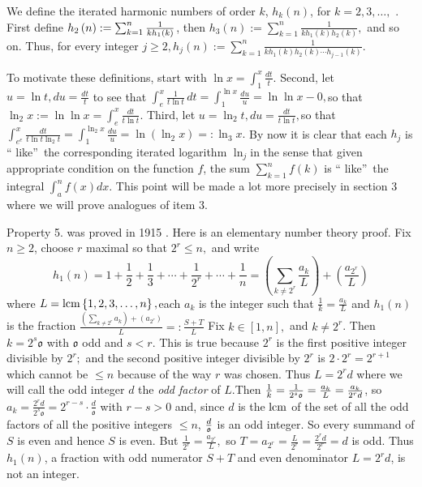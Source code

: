 \documentclass{article}
\begin{document}
We define the iterated harmonic numbers of order $k$, $h_{k}(n)$, for $%
k=2,3,\dots ,$ . First define $h_{2}\left( n\right) :=\sum_{k=1}^{n}\frac{1}{%
kh_{1}\left( k\right) }$, then $h_{3}\left( n\right) :=\sum_{k=1}^{n}\frac{1%
}{kh_{1}\left( k\right) h_{2}\left( k\right) },$ and so on. Thus, for every
integer $j\geq 2,h_{j}\left( n\right) :=\sum_{k=1}^{n}\frac{1}{kh_{1}\left(
k\right) h_{2}\left( k\right) \cdots h_{j-1}\left( k\right) }$.

To motivate these definitions, start with $\ln x=\int_{1}^{x}\frac{dt}{t}.$%
Second, let $u=\ln t,du=\frac{dt}{t}$ to see that $\allowbreak \int_{e}^{x}%
\frac{1}{t\ln t}\,dt=\int_{1}^{\ln x}\frac{du}{u}=\ln \ln x-0,$so that $\ln
_{2}x:=\ln \ln x=\int_{e}^{x}\frac{dt}{t\ln t}$. Third, let $u=\ln _{2}t,du=%
\frac{dt}{t\ln t},$so that $\int_{e^{e}}^{x}\frac{dt}{t\ln t\ln _{2}t}%
=\int_{1}^{\ln _{2}x}\frac{du}{u}=\ln \left( \ln _{2}x\right) =:\ln _{3}x.$
By now it is clear that each $h_{j}$ is \textquotedblleft
like\textquotedblright\ the corresponding iterated logarithm $\ln _{j}$in
the sense that given appropriate condition on the function $f$, the sum $%
\sum_{k=1}^{n}f\left( k\right) $ is \textquotedblleft
like\textquotedblright\ the integral $\int_{a}^{n}f\left( x\right) dx.$ This
point will be made a lot more precisely in section 3 where we will prove
analogues of item 3.

Property 5. was proved in 1915 \cite{T}. Here is an elementary number theory
proof. Fix $n\geq 2$, choose $r$ maximal so that $2^{r}\leq n,$ and write 
\begin{equation*}
h_{1}\left( n\right) =1+\frac{1}{2}+\frac{1}{3}+\cdots +\frac{1}{2^{r}}%
+\cdots +\frac{1}{n}=\left( \sum_{k\neq 2^{r}}\frac{a_{k}}{L}\right) +\left( 
\frac{a_{2^{r}}}{L}\right)
\end{equation*}%
where $L=\mathop{\rm lcm}\left\{ 1,2,3,\dots ,n\right\} ,$each $a_{k}$ is the
integer such that $\frac{1}{k}=\frac{a_{k}}{L}$ and $h_{1}\left( n\right) $
is the fraction $\frac{\left( \sum_{k\neq 2^{r}}a_{k}\right) +\left(
a_{2^{r}}\right) }{L}=:\frac{S+T}{L}$ Fix $k\in \left[ 1,n\right] ,$ and $%
k\neq 2^{r}$. Then $k=2^{s}\mathfrak{o}$ with $\mathfrak{o}$ odd and $s<r.$
This is true because $2^{r}$ is the first positive integer divisible by $%
2^{r};$ and the second positive integer divisible by $2^{r}$ is $2\cdot
2^{r}=2^{r+1}$ which cannot be $\leq n$ because of the way $r$ was chosen.
Thus $L=2^{r}d$ where we will call the odd integer $d$ the \textit{odd factor%
} of $L.$Then $\frac{1}{k}=\frac{1}{2^{s}\mathfrak{o}}=\frac{a_{k}}{L}=\frac{%
a_{k}}{2^{r}d}$, so $a_{k}=\frac{2^{r}d}{2^{s}\mathfrak{o}}=2^{r-s}\cdot 
\frac{d}{\mathfrak{o}}$ with $r-s>0$ and, since $d$ is the $\mathop{\rm lcm}\ $of
the set of all the odd factors of all the positive integers $\leq n$, $\frac{%
d}{\mathfrak{o}}$ is an odd integer. So every summand of $S$ is even and
hence $S$ is even. But $\frac{1}{2^{r}}=\frac{a_{2^{r}}}{L},$ so $%
T=a_{2^{r}}=\frac{L}{2^{r}}=\frac{2^{r}d}{2^{r}}=d$ is odd. Thus $%
h_{1}\left( n\right) $, a fraction with odd numerator $S+T$ and even
denominator $L=2^{r}d$, is not an integer.
\end{document}
